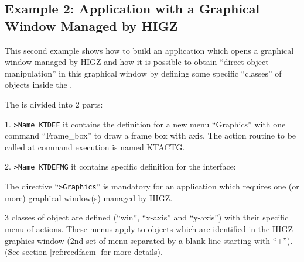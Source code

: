 \subsection{Example 2: Application with a Graphical Window Managed by HIGZ}
\label{ref:reexgr}

This second example shows how to build an application which opens a graphical 
window managed by HIGZ and how it is possible to obtain ``direct object
manipulation'' in this graphical window by defining  some specific ``classes''
of objects inside the \CDF{}.

The \CDF{} is divided into 2 parts:
\begin{UL}
\item[1.] {\tt >Name KTDEF} \hfill\break 
it contains the definition for a new menu ``Graphics'' with one command
``Frame\_box'' to draw a frame box with axis. \hfill\break
The action routine to be called at command execution is named KTACTG.
\item[2.] {\tt >Name KTDEFMG} \hfill\break
it contains specific definition for the \KUIPMotif{} interface:
\begin{UL}
\item The directive ``{\tt >Graphics}'' is mandatory for an 
application which requires one (or more) 
graphical window(s) managed by HIGZ.
\item 3 classes of object are defined (``win'', ``x-axis'' and ``y-axis'')
with their specific menu of actions.  These menus apply to objects which 
are identified in the HIGZ graphics window (2nd set of menu separated by a
blank line starting with ``+''). (See section \ref{ref:recdfacm} for more
details).
\end{UL}
\end{UL}

